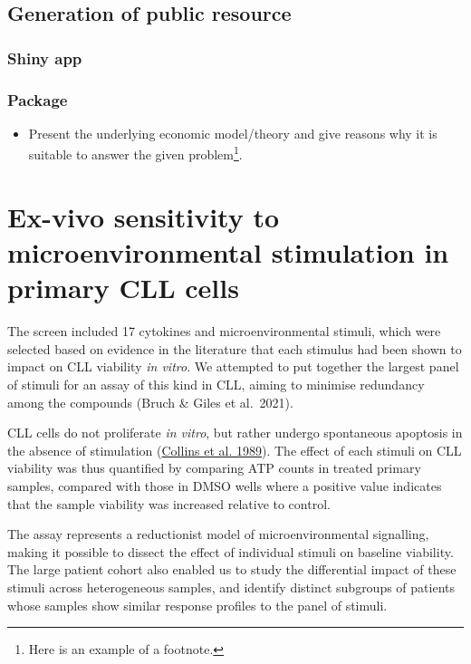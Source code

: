 \documentclass[11pt, a4paper, twosided]{book}
\providecommand{\tightlist}{%
  \setlength{\itemsep}{0pt}\setlength{\parskip}{0pt}}
\begin{document}
\hypertarget{generation-of-public-resource}{%
\section{Generation of public resource}\label{generation-of-public-resource}}

\hypertarget{shiny-app}{%
\subsection{Shiny app}\label{shiny-app}}

\hypertarget{package}{%
\subsection{Package}\label{package}}
\begin{itemize}
\tightlist
\item
  Present the underlying economic model/theory and give reasons why it is
  suitable to answer the given problem\footnote{Here is an example of a footnote.}.
\end{itemize}
\hypertarget{ex-vivo-sensitivity-to-microenvironmental-stimulation-in-primary-cll-cells}{%
\chapter{Ex-vivo sensitivity to microenvironmental stimulation in primary CLL cells}\label{ex-vivo-sensitivity-to-microenvironmental-stimulation-in-primary-cll-cells}}

The screen included 17 cytokines and microenvironmental stimuli, which were selected based on evidence in the literature that each stimulus had been shown to impact on CLL viability \emph{in vitro}. We attempted to put together the largest panel of stimuli for an assay of this kind in CLL, aiming to minimise redundancy among the compounds (Bruch \& Giles et al.~2021).

CLL cells do not proliferate \emph{in vitro}, but rather undergo spontaneous apoptosis in the absence of stimulation (\protect\hyperlink{ref-Collins1989}{Collins et al. 1989}). The effect of each stimuli on CLL viability was thus quantified by comparing ATP counts in treated primary samples, compared with those in DMSO wells where a positive value indicates that the sample viability was increased relative to control.

The assay represents a reductionist model of microenvironmental signalling, making it possible to dissect the effect of individual stimuli on baseline viability. The large patient cohort also enabled us to study the differential impact of these stimuli across heterogeneous samples, and identify distinct subgroups of patients whose samples show similar response profiles to the panel of stimuli.
\end{document}
